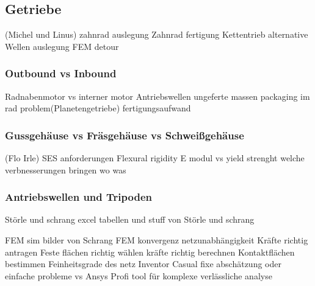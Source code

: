\subsection{Getriebe} (Michel und Linus)
zahnrad auslegung
Zahnrad fertigung
Kettentrieb alternative
Wellen auslegung
FEM detour

\subsubsection{Outbound vs Inbound}
Radnabenmotor vs interner motor
Antriebswellen
ungeferte massen
packaging im rad problem(Planetengetriebe) fertigungsaufwand

\subsubsection{Gussgehäuse vs Fräsgehäuse vs Schweißgehäuse} (Flo Irle)
SES anforderungen
Flexural rigidity
E modul vs yield strenght welche verbnesserungen bringen wo was


\subsubsection{Antriebswellen und Tripoden} Störle und schrang
excel tabellen und stuff von Störle und schrang

FEM sim bilder von Schrang
FEM konvergenz
netzunabhängigkeit
Kräfte richtig antragen
Feste flächen richtig wählen
kräfte richtig berechnen
Kontaktflächen bestimmen
Feinheitsgrade des netz
Inventor Casual fixe abschätzung oder einfache probleme vs Ansys Profi tool für komplexe verlässliche analyse
